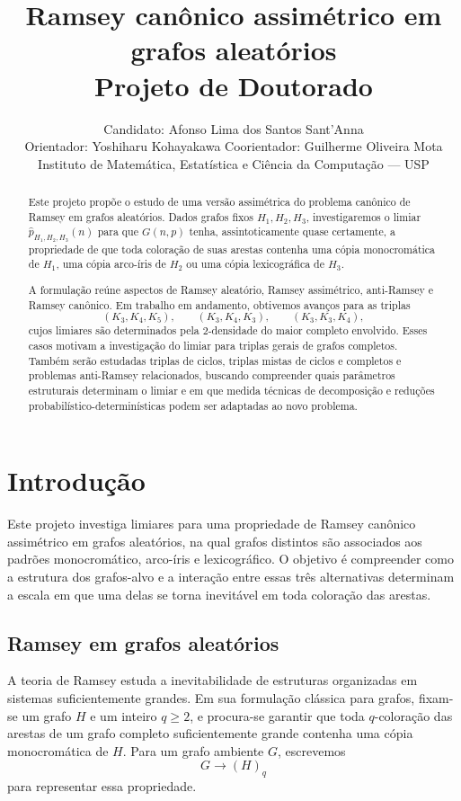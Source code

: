 \documentclass[11pt,a4paper]{article}
\title{\textbf{Ramsey canônico assimétrico em grafos aleatórios}\\[2mm]
\large Projeto de Doutorado}
\author{Candidato: Afonso Lima dos Santos Sant'Anna\\
Orientador: Yoshiharu Kohayakawa \quad Coorientador: Guilherme Oliveira Mota\\
Instituto de Matemática, Estatística e Ciência da Computação --- USP}
\date{}
\theoremstyle{plain}
\theoremstyle{definition}
\begin{document}
\maketitle

\begin{abstract}
  Este projeto propõe o estudo de uma versão assimétrica do problema canônico de
  Ramsey em grafos aleatórios. Dados grafos fixos $H_1,H_2,H_3$, investigaremos
  o limiar $\widehat p_{H_1,H_2,H_3}(n)$ para que $G(n,p)$ tenha,
  assintoticamente quase certamente, a propriedade de que toda coloração de suas
  arestas contenha uma cópia monocromática de $H_1$, uma cópia arco-íris de
  $H_2$ ou uma cópia lexicográfica de $H_3$.

  A formulação reúne aspectos de Ramsey aleatório, Ramsey assimétrico,
  anti-Ramsey e Ramsey canônico. Em trabalho em andamento, obtivemos avanços para
  as triplas
  \[
    (K_3,K_4,K_5),\qquad
    (K_3,K_4,K_3),\qquad
    (K_3,K_3,K_4),
  \]
  cujos limiares são determinados pela $2$-densidade do maior completo envolvido.
  Esses casos motivam a investigação do limiar para triplas gerais de grafos
  completos. Também serão estudadas triplas de ciclos, triplas mistas de ciclos
  e completos e problemas anti-Ramsey relacionados, buscando compreender quais
  parâmetros estruturais determinam o limiar e em que medida técnicas de
  decomposição e reduções probabilístico-determinísticas podem ser adaptadas ao
  novo problema.
\end{abstract}

\tableofcontents


\section{Introdução}

\label{sec:introducao}


Este projeto investiga limiares para uma propriedade de Ramsey canônico
assimétrico em grafos aleatórios, na qual grafos distintos são associados
aos padrões monocromático, arco-íris e lexicográfico. O objetivo é compreender
como a estrutura dos grafos-alvo e a interação entre essas três alternativas
determinam a escala em que uma delas se torna inevitável em toda coloração
das arestas.


\subsection{Ramsey em grafos aleatórios}


A teoria de Ramsey estuda a inevitabilidade de estruturas organizadas em
sistemas suficientemente grandes. Em sua formulação clássica para grafos,
fixam-se um grafo $H$ e um inteiro $q\ge2$, e procura-se garantir que toda
$q$-coloração das arestas de um grafo completo suficientemente grande contenha
uma cópia monocromática de $H$. Para um grafo ambiente $G$, escrevemos
\[
  G\longrightarrow(H)_q
\]
para representar essa propriedade.
\end{document}
